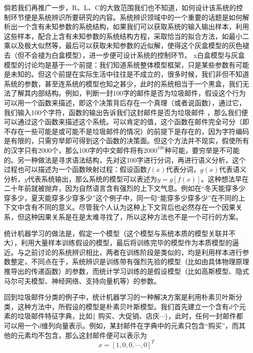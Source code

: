 倘若我们再推广一步，R、L、C的大致范围我们也不知道，如何设计该系统的控制环节便是系统辨识所要研究的内容。系统辨识领域中的一个重要的话题是如何解析出一个含有未知参数的系统结构，如果我们可以获取系统的输入输出样本，利用这些样本，配合上含有未知参数的系统结构方程，采取恰当的拟合方法，如最小二乘以及极大似然等，最后可以获取未知参数的近似解，使得这个灰盒模型的灰色褪去（但不会褪为白盒模型），进一步便可设计系统的控制环节。
x白盒模型与灰盒模型的讨论均是基于一个前提：我们知道系统整体模型框架，只是某些参数有可能是未知的。但这个前提在实际生活中往往是不成立的，很多时候，我们非但不知道系统的参数，甚至连系统的模型也知之甚少，此时的系统相当于一个黑盒，我们无法了解其内部结构。例如，判断一封100字的邮件是否为垃圾邮件，假设这个行为可以用一个函数来描述，即这个决策背后存在一个真理（或者说函数），通过它，我们输入100个字符，函数的输出告诉我们这封邮件是否为垃圾邮件 ，那么我们便可以通过这个函数来描述这个系统。可以肯定的值，这个函数在邮件完全可分（即不存在一些可能是或可能不是垃圾邮件的情况）的前提下是存在的，因为字符编码是有限的，只需穷举即可得到这个函数的决策面。但这个方法并不现实，假使所有的汉字只有2000个，那么100字的中文邮件将有$2000^{100}$种可能，要穷举是不可能的。另一种做法是寻求语法结构，先对这100字进行分词，再进行语义分析，这个过程也可以描述为一个函数映射过程：假设函数$f(x)$代表分词，$g(x)$代表语义分析，$y$代表系统输出，那么系统的模型可以表述为$y = g[f(x)]$。这种想法早在二十年前就被抛弃，因为自然语言含有强烈的上下文气息。例如在“冬天能穿多少穿多少，夏天能穿多少穿多少”这个例子中，同一句“能穿多少穿多少”在不同的上下文中含有不同的意义。尽管我个人认为这种上下文背后也必然存在一个因果关系，但这种因果关系是在是太难寻找了，所以这种方法也不是一个可行的方案。

统计机器学习的做法是，假定一个模型（这个模型与系统本质的模型关联并不大），利用大量样本训练假设的模型，最后将训练完毕的模型作为本质模型的逼近。与之前讨论的系统辨识相比，两者在训练阶段是类似的，均是利用样本进行参数整定，不同点在于，系统辨识是训练带有强烈先验的模型（比如由具体物理原理推导出的传递函数）的参数，而统计学习训练的是假设模型（比如高斯模型、隐式马尔可夫模型、神经网络、支持向量机等）的参数。

回到垃圾邮件分类的例子中，统计机器学习的一种解决方案是利用朴素贝叶斯分类，这种方法中，所假设的模型是朴素贝叶斯模型。我们首先建立一个含有$d$个元素的垃圾邮件特征字典，比如$\{$ 购买、大促销、店庆$\cdots \}$，此时，任何一封邮件都可以用一个$d$维列向量表示。例如，某封邮件在字典中的元素只包含“购买”，而其他的元素均不包含，那么这封邮件便可以表示为
\begin{equation}
x = [1, 0, 0, \cdots , 0]^T
\end{equation}

